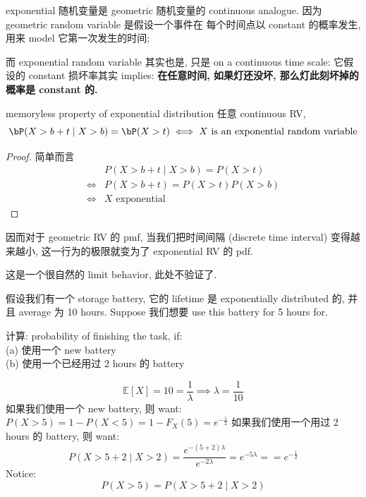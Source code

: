 \begin{remark}
exponential 随机变量是 geometric 随机变量的 continuous analogue.
因为 geometric random variable 是假设一个事件在 
每个时间点以 constant 的概率发生,
用来 model 它第一次发生的时间;

而 exponential random variable 其实也是, 只是 on a continuous
 time scale: 
 它假设的 constant 损坏率其实 implies:
\textbf{在任意时间, 如果灯还没坏, 那么灯此刻坏掉的概率是 constant 的.} 
\begin{theorem}{memoryless property of exponential distribution}
任意 continuous RV, \[
 \bP(X > b+ t \mid X > b) = \bP(X>t) \iff X \text{ is an exponential random variable}
    \]
\end{theorem}
\begin{proof}
简单而言
\begin{align}
     &   P(X > b+ t \mid X > b) = P(X>t) \\
   \Longleftrightarrow  & P(X > b+t) = P(X > t) P(X>b) \\
    \Longleftrightarrow  & X \text{ exponential}
\end{align}
\end{proof}
因而对于 geometric RV 的 pmf, 当我们把时间间隔 (discrete time interval) 变得越来越小,
这一行为的极限就变为了 exponential RV 的 pdf. 

这是一个很自然的 limit behavior, 此处不验证了.
\end{remark}

\begin{example}
假设我们有一个 storage battery, 它的 lifetime 是 exponentially distributed 的, 并且 average 为 10 hours. Suppose 我们想要 use this battery for 5 hours for.

计算: probability of finishing the task, if:\\
(a) 使用一个 new battery\\
(b) 使用一个已经用过 2 hours 的 battery\\
\begin{solution}
    \[
    \mathbb{E}[X] = 10 = \frac{1}{\lambda} \implies \lambda = \frac{1}{10}
    \]
如果我们使用一个 new battery, 则 want: $P(X>5) = 1 - P(X<5) = 1- F_X(5) = e^{-\frac{1}{2}}$
如果我们使用一个用过 2 hours 的 battery, 则 want: \[
P(X> 5+2 \mid X > 2) = \frac{e^{-(5+2)\lambda}}{e^{-2\lambda }} = e^{-5\lambda} = = e^{-\frac{1}{2}}
\]
Notice:  \[
P(X>5) = P(X> 5+2 \mid X > 2)
\]
\end{solution} 

\end{example}





